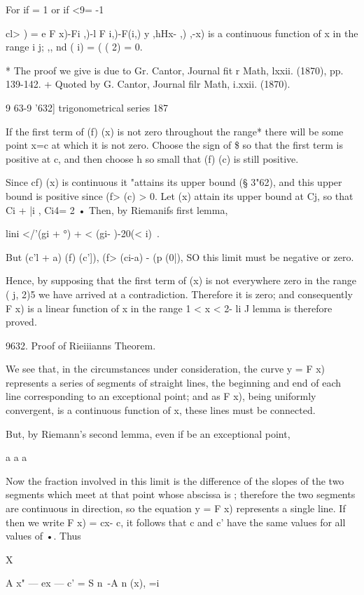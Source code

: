 {For if = 1 or if <9= -1

cl> ) = e F x)-Fi ,)-l F i,)-F(i,) y ,hHx- ,) ,-x) is a continuous
function of x in the range i j; ,, nd ( i) = ( ( 2) = 0.

* The proof we give is due to Gr. Cantor, Journal fit r Math, lxxii.
(1870), pp. 139-142. + Quoted by G. Cantor, Journal filr Math, i.xxii.
(1870).

9 63-9 '632] trigonometrical series 187

If the first term of (f) (x) is not zero throughout the range* there
will be some point x=c at which it is not zero. Choose the sign of \$
so that the first term is positive at c, and then choose h so small
that (f) (c) is still positive.

Since cf) (x) is continuous it "attains its upper bound (§ 3"62), and
this upper bound is positive since (f> (c) > 0. Let (x) attain its
upper bound at Cj, so that Ci + |i , Ci4= 2 • Then, by Riemanifs first
lemma,

lini </'(gi + °) + < (gi- )-20(< i)\ .

But (c'l + a) (f) (c']), (f> (ci-a) - (p (0|), SO this limit must be
negative or zero.

Hence, by supposing that the first term of (x) is not everywhere zero
in the range ( j, 2)5 we have arrived at a contradiction. Therefore it
is zero; and consequently F x) is a linear function of x in the range
1 < x < 2- li J lemma is therefore proved.

9632. Proof of Rieiiianns Theorem.

We see that, in the circumstances under consideration, the curve y = F
x) represents a series of segments of straight lines, the beginning
and end of each line corresponding to an exceptional point; and as F
x), being uniformly convergent, is a continuous function of x, these
lines must be connected.

But, by Riemann's second lemma, even if be an exceptional point,

a a a

Now the fraction involved in this limit is the difference of the
slopes of the two segments which meet at that point whose abscissa is
; therefore the two segments are continuous in direction, so the
equation y = F x) represents a single line. If then we write F x) =
cx- c, it follows that c and c' have the same values for all values of
•. Thus

X

 A x" — ex — c' = S n~-A n (x), =i

}
